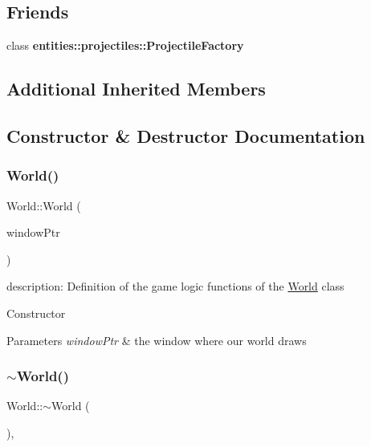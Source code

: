 \subsection*{Friends}
\begin{DoxyCompactItemize}
\item 
\mbox{\label{classWorld_a59d0171925be26338b8e5665e281cc97}} 
class {\bfseries entities\+::projectiles\+::\+Projectile\+Factory}
\end{DoxyCompactItemize}
\subsection*{Additional Inherited Members}


\subsection{Constructor \& Destructor Documentation}
\mbox{\label{classWorld_a96ca734b18df2cf85e666fc6d358e12c}} 
\subsubsection{\texorpdfstring{World()}{World()}}
{\footnotesize\ttfamily World\+::\+World (\begin{DoxyParamCaption}\item[{std\+::shared\+\_\+ptr$<$ sf\+::\+Render\+Window $>$}]{window\+Ptr }\end{DoxyParamCaption})\hspace{0.3cm}{\ttfamily [explicit]}}



description\+: Definition of the game logic functions of the \hyperlink{classWorld}{World} class 

Constructor 
\begin{DoxyParams}{Parameters}
{\em window\+Ptr} & the window where our world draws \\
\hline
\end{DoxyParams}
\mbox{\label{classWorld_adf5e8724afb4d083e566ee4e48905bf2}} 
\subsubsection{\texorpdfstring{$\sim$\+World()}{~World()}}
{\footnotesize\ttfamily World\+::$\sim$\+World (\begin{DoxyParamCaption}{ }\end{DoxyParamCaption})\hspace{0.3cm}{\ttfamily [override]}, {\ttfamily [default]}}

